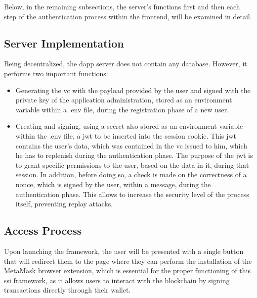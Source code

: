 Below, in the remaining subsections, the server's functions first and then each step of the authentication process within the frontend, will be examined in detail.

\subsection{Server Implementation}

Being decentralized, the \gls{dapp} server does not contain any database. However, it performs two important functions:

\begin{itemize}
  \item Generating the \gls{vc} with the payload provided by the user and signed with the private key of the application administration, stored as an environment variable within 
  a .env file, during the registration phase of a new user.

  

  \item	Creating and signing, using a secret also stored as an environment variable within the .env file, a \gls{jwt} to be inserted into the session cookie. 
  This \gls{jwt} contains the user's data, which was contained in the \gls{vc} issued to him, which he has to replenish during the authentication phase. The purpose of the \gls{jwt} is to 
  grant specific permissions to the user, based on the data in it, during that session. In addition, before doing so, a check is made on the correctness of a \gls{nonce}, 
  which is signed by the user, within a message, during the authentication phase. This allows to increase the security level of the process itself, preventing replay attacks.

  

\end{itemize}

\subsection{Access Process}

Upon launching the framework, the user will be presented with a single button that will redirect them to the page where they can perform the installation of the MetaMask 
browser extension, which is essential for the proper functioning of this \gls{ssi} framework, as it allows users to interact with the blockchain by signing transactions directly 
through their wallet.

